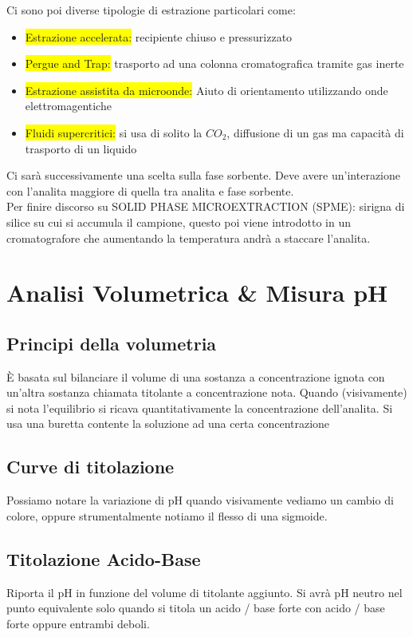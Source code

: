 \documentclass{article}
\begin{document}
Ci sono poi diverse tipologie di estrazione particolari come:
\begin{itemize}
	\item \colorbox{yellow}{Estrazione accelerata:} recipiente chiuso e pressurizzato
	\item \colorbox{yellow}{Pergue and Trap:} trasporto ad una colonna cromatografica tramite gas inerte
	\item \colorbox{yellow}{Estrazione assistita da microonde:} Aiuto di orientamento utilizzando onde elettromagentiche
	\item \colorbox{yellow}{Fluidi supercritici:} si usa di solito la $CO_2$, diffusione di un gas ma capacità di trasporto di un liquido
\end{itemize}
%
Ci sarà successivamente una scelta sulla fase sorbente. Deve avere un'interazione con l'analita maggiore di quella tra analita e fase sorbente.
\\
Per finire discorso su SOLID PHASE MICROEXTRACTION (SPME): sirigna di silice su cui si accumula il campione, questo poi viene introdotto in un cromatografore che aumentando la temperatura andrà a staccare l'analita.



\newpage

\section{Analisi Volumetrica \& Misura pH}

\subsection{Principi della volumetria} 
È basata sul bilanciare il volume di una sostanza a concentrazione ignota con un'altra sostanza chiamata titolante a concentrazione nota. Quando (visivamente) si nota l'equilibrio si ricava quantitativamente la concentrazione dell'analita.
Si usa una buretta contente la soluzione ad una certa concentrazione

\subsection{Curve di titolazione}
Possiamo notare la variazione di pH quando visivamente vediamo un cambio di colore, oppure strumentalmente notiamo il flesso di una sigmoide.

\subsection{Titolazione Acido-Base}
Riporta il pH in funzione del volume di titolante aggiunto. Si avrà pH neutro nel punto equivalente solo quando si titola un acido / base forte con acido / base forte oppure entrambi deboli.
\end{document}
